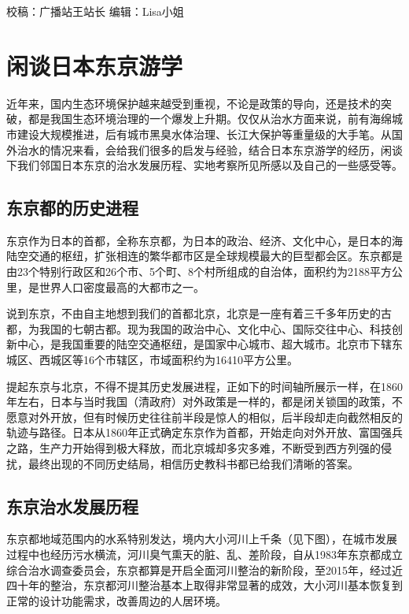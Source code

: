\documentclass[]{book}
\begin{document}
校稿：广播站王站长
编辑：Lisa小姐

\hypertarget{ux95f2ux8c08ux65e5ux672cux4e1cux4eacux6e38ux5b66}{%
\section{闲谈日本东京游学}\label{ux95f2ux8c08ux65e5ux672cux4e1cux4eacux6e38ux5b66}}

近年来，国内生态环境保护越来越受到重视，不论是政策的导向，还是技术的突破，都是我国生态环境治理的一个爆发上升期。仅仅从治水方面来说，前有海绵城市建设大规模推进，后有城市黑臭水体治理、长江大保护等重量级的大手笔。从国外治水的情况来看，会给我们很多的启发与经验，结合日本东京游学的经历，闲谈下我们邻国日本东京的治水发展历程、实地考察所见所感以及自己的一些感受等。

\hypertarget{ux4e1cux4eacux90fdux7684ux5386ux53f2ux8fdbux7a0b}{%
\subsection{东京都的历史进程}\label{ux4e1cux4eacux90fdux7684ux5386ux53f2ux8fdbux7a0b}}

东京作为日本的首都，全称东京都，为日本的政治、经济、文化中心，是日本的海陆空交通的枢纽，扩张相连的繁华都市区是全球规模最大的巨型都会区。东京都是由23个特别行政区和26个市、5个町、8个村所组成的自治体，面积约为2188平方公里，是世界人口密度最高的大都市之一。

说到东京，不由自主地想到我们的首都北京，北京是一座有着三千多年历史的古都，为我国的七朝古都。现为我国的政治中心、文化中心、国际交往中心、科技创新中心，是我国重要的陆空交通枢纽，是国家中心城市、超大城市。北京市下辖东城区、西城区等16个市辖区，市域面积约为16410平方公里。

提起东京与北京，不得不提其历史发展进程，正如下的时间轴所展示一样，在1860年左右，日本与当时我国（清政府）对外政策是一样的，都是闭关锁国的政策，不愿意对外开放，但有时候历史往往前半段是惊人的相似，后半段却走向截然相反的轨迹与路径。日本从1860年正式确定东京作为首都，开始走向对外开放、富国强兵之路，生产力开始得到极大释放，而北京城却多灾多难，不断受到西方列强的侵扰，最终出现的不同历史结局，相信历史教科书都已给我们清晰的答案。

\hypertarget{ux4e1cux4eacux6cbbux6c34ux53d1ux5c55ux5386ux7a0b}{%
\subsection{东京治水发展历程}\label{ux4e1cux4eacux6cbbux6c34ux53d1ux5c55ux5386ux7a0b}}

东京都地域范围内的水系特别发达，境内大小河川上千条（见下图），在城市发展过程中也经历污水横流，河川臭气熏天的脏、乱、差阶段，自从1983年东京都成立综合治水调查委员会，东京都算是开启全面河川整治的新阶段，至2015年，经过近四十年的整治，东京都河川整治基本上取得非常显著的成效，大小河川基本恢复到正常的设计功能需求，改善周边的人居环境。
\end{document}
